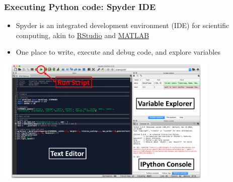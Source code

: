 \documentclass[pdf]{beamer}
\begin{document}
\begin{frame}[fragile]
\frametitle{Executing Python code: Spyder IDE}
\begin{itemize}\addtolength{\itemsep}{.7\baselineskip}
	\item Spyder is an integrated development environment (IDE) for scientific computing, akin to \href{https://www.rstudio.com/}{RStudio} and \href{https://uk.mathworks.com/products/matlab.html}{MATLAB} 
	\item One place to write, execute and debug code, and explore variables
\end{itemize}

\begin{center}
\includegraphics[width=0.8\textwidth]{spyder_annotated.pdf}
\end{center}
\end{frame}

\end{document}
